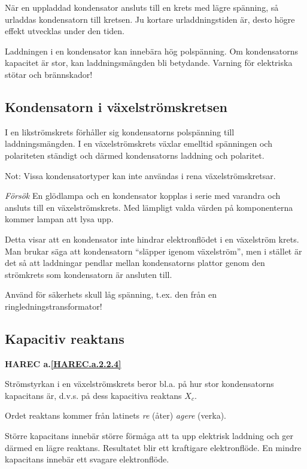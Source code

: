 När en uppladdad kondensator ansluts till en krets med lägre spänning, så
urladdas kondensatorn till kretsen. Ju kortare urladdningstiden är, desto högre
effekt utvecklas under den tiden.

Laddningen i en kondensator kan innebära hög polspänning. Om kondensatorns
kapacitet är stor, kan laddningsmängden bli betydande. Varning för elektriska
stötar och brännskador!

\subsection{Kondensatorn i växelströmskretsen}

I en likströmskrets förhåller sig kondensatorns polspänning till
laddningsmängden. I en växelströmskrets växlar emelltid spänningen och
polariteten ständigt och därmed kondensatorns laddning och polaritet.

Not: Vissa kondensatortyper kan inte användas i rena växelströmskretsar.

\emph{Försök}
En glödlampa och en kondensator kopplas i serie med varandra och ansluts till en
växelströmskrets. Med lämpligt valda värden på komponenterna kommer lampan att
lysa upp.

Detta visar att en kondensator inte hindrar elektronflödet i en växelström
krets. Man brukar säga att kondensatorn ``släpper igenom växelström'', men i
stället är det så att laddningar pendlar mellan kondensatorns plattor genom den
strömkrets som kondensatorn är ansluten till.

Använd för säkerhets skull låg spänning, t.ex. den från en
ringledningstransformator!

\subsection{Kapacitiv reaktans}
\textbf{HAREC a.\ref{HAREC.a.2.2.4}\label{myHAREC.a.2.2.4}}

Strömstyrkan i en växelströmskrets beror bl.a. på hur stor kondensatorns
kapacitans är, d.v.s. på dess kapacitiva reaktans \(X_c\).

Ordet reaktans kommer från latinets \emph{re} (åter) \emph{agere} (verka).

Större kapacitans innebär större förmåga att ta upp elektrisk laddning och ger
därmed en lägre reaktans. Resultatet blir ett kraftigare elektronflöde.
En mindre kapacitans innebär ett svagare elektronflöde.

